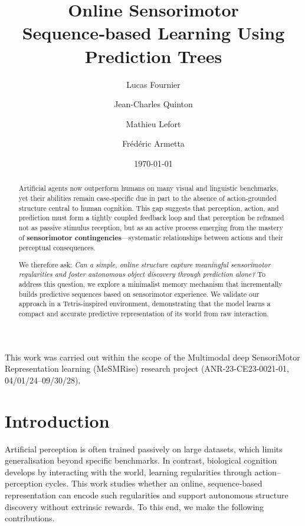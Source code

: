 \documentclass[11pt]{article}
\title{ Online Sensorimotor Sequence‑based Learning Using Prediction Trees }
\author[ ]{Lucas Fournier}
\author[1]{Jean-Charles Quinton}
\author[2]{Mathieu Lefort}
\author[2]{Frédéric Armetta}
\affil[1]{Univ. Grenoble Alpes, CNRS, Grenoble INP, LJK, UMR 5224}
\affil[2]{Univ. Lyon, UCBL, CNRS, INSA Lyon, LIRIS, UMR 5205}
\date{\today}
\begin{document}
\maketitle

\begin{center}\small This work was carried out within the scope of the Multimodal deep SensoriMotor Representation learning (MeSMRise) research project (ANR-23-CE23-0021-01, 04/01/24–09/30/28).\end{center}

\begin{abstract}
Artificial agents now outperform humans on many visual and linguistic benchmarks, yet their abilities remain case‑specific due in part to the absence of action‑grounded structure central to human cognition. This gap suggests that perception, action, and prediction must form a tightly coupled feedback loop and that perception be reframed not as passive stimulus reception, but as an active process emerging from the mastery of \textbf{sensorimotor contingencies}—systematic relationships between actions and their perceptual consequences.

We therefore ask: \emph{Can a simple, online structure capture meaningful sensorimotor regularities and foster autonomous object discovery through prediction alone?}
To address this question, we explore a minimalist memory mechanism that incrementally builds predictive sequences based on sensorimotor experience. We validate our approach in a Tetris-inspired environment, demonstrating that the model learns a compact and accurate predictive representation of its world from raw interaction.
\end{abstract}

\newpage

\tableofcontents

\newpage

\section{Introduction}

Artificial perception is often trained passively on large datasets, which limits generalisation beyond specific benchmarks. In contrast, biological cognition develops by interacting with the world, learning regularities through action–perception cycles. This work studies whether an online, sequence‑based representation can encode such regularities and support autonomous structure discovery without extrinsic rewards. To this end, we make the following contributions.
\end{document}
